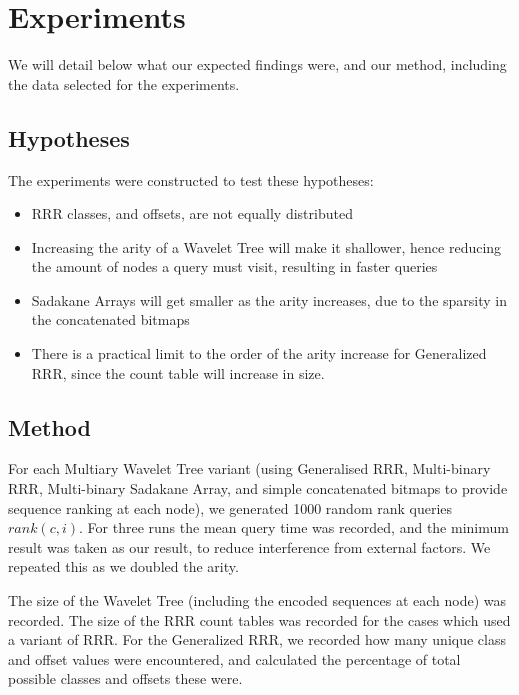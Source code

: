 \section{Experiments}
We will detail below what our expected findings were, and our method, including the data selected for the experiments.

\subsection{Hypotheses}
The experiments were constructed to test these hypotheses:

\begin{itemize}
    \item 	
			RRR classes, and offsets, are not equally distributed

    \item 	
			Increasing the arity of a Wavelet Tree will make it shallower,
		   	hence reducing the amount of nodes a query must visit, resulting
		   	in faster queries
		
    \item 	
			Sadakane Arrays will get smaller as the arity increases, due to
			the sparsity in the concatenated bitmaps
			
    \item  
			There is a practical limit to the order of the arity increase for 
		   	Generalized RRR, since the count table will increase in size.
\end{itemize}

\subsection{Method}
For each Multiary Wavelet Tree variant (using Generalised RRR, Multi-binary
RRR, Multi-binary Sadakane Array, and simple concatenated bitmaps to provide
sequence ranking at each node), we generated 1000 random rank queries $rank(c, 
i)$. For three runs the mean query time was recorded, and the minimum result was
taken as our result, to reduce interference from external factors. We repeated
this as we doubled the arity.

The size of  the Wavelet Tree (including the encoded sequences at each node) was 
recorded. The size of the RRR count tables was recorded for the cases which used 
a variant of RRR. For the Generalized RRR, we recorded how many unique class and 
offset values were encountered, and calculated the percentage of total possible 
classes and offsets these were.

